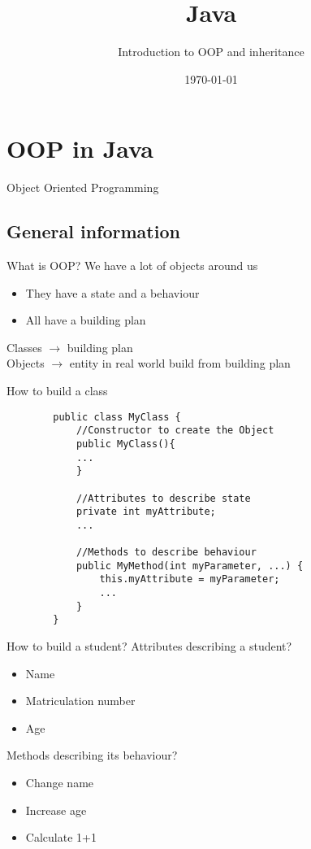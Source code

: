 


\title{Java}
\subtitle{Introduction to OOP and inheritance}
\date{\today}



\section{OOP in Java}

\begin{frame}{}
	\begin{center}
		{\huge Object Oriented Programming}
	\end{center}
\end{frame}

\subsection{General information}

\begin{frame}[fragile]{What is OOP?}
	We have a lot of objects around us\\
	\begin{itemize}
		\item They have a state and a behaviour
		\item All have a building plan
	\end{itemize}
	
	Classes $ \rightarrow $ building plan\\
	Objects $ \rightarrow $ entity in real world build from building plan
	
\end{frame}

\begin{frame}[fragile]{How to build a class}
	\begin{lstlisting}
		public class MyClass {
			//Constructor to create the Object
			public MyClass(){
			...
			}
			
			//Attributes to describe state
			private int myAttribute;
			...
			
			//Methods to describe behaviour
			public MyMethod(int myParameter, ...) {
				this.myAttribute = myParameter;
				...
			}
		}
	\end{lstlisting}
\end{frame}

\begin{frame}[fragile]{How to build a student?}
	Attributes describing a student? \\
	\pause 
	\begin{itemize}
		\item Name
		\item Matriculation number
		\item Age
	\end{itemize}	
	\pause
	Methods describing its behaviour?
	\pause
	\begin{itemize}
		\item Change name
		\item Increase age
		\item Calculate 1+1
	\end{itemize}
\end{frame}

